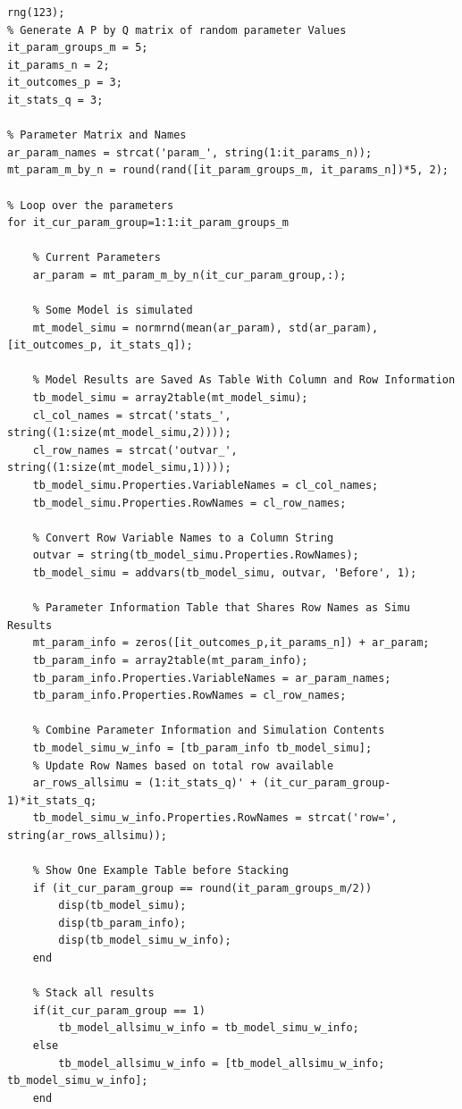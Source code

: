 \documentclass[
]{book}
\begin{document}
\begin{verbatim}
rng(123);
% Generate A P by Q matrix of random parameter Values
it_param_groups_m = 5; 
it_params_n = 2;
it_outcomes_p = 3;
it_stats_q = 3;

% Parameter Matrix and Names
ar_param_names = strcat('param_', string(1:it_params_n));
mt_param_m_by_n = round(rand([it_param_groups_m, it_params_n])*5, 2);

% Loop over the parameters
for it_cur_param_group=1:1:it_param_groups_m
    
    % Current Parameters
    ar_param = mt_param_m_by_n(it_cur_param_group,:);
    
    % Some Model is simulated
    mt_model_simu = normrnd(mean(ar_param), std(ar_param), [it_outcomes_p, it_stats_q]);
    
    % Model Results are Saved As Table With Column and Row Information
    tb_model_simu = array2table(mt_model_simu);
    cl_col_names = strcat('stats_', string((1:size(mt_model_simu,2))));
    cl_row_names = strcat('outvar_', string((1:size(mt_model_simu,1))));
    tb_model_simu.Properties.VariableNames = cl_col_names;
    tb_model_simu.Properties.RowNames = cl_row_names;    
        
    % Convert Row Variable Names to a Column String
    outvar = string(tb_model_simu.Properties.RowNames);
    tb_model_simu = addvars(tb_model_simu, outvar, 'Before', 1);
    
    % Parameter Information Table that Shares Row Names as Simu Results
    mt_param_info = zeros([it_outcomes_p,it_params_n]) + ar_param;
    tb_param_info = array2table(mt_param_info);
    tb_param_info.Properties.VariableNames = ar_param_names;
    tb_param_info.Properties.RowNames = cl_row_names;
    
    % Combine Parameter Information and Simulation Contents
    tb_model_simu_w_info = [tb_param_info tb_model_simu];
    % Update Row Names based on total row available
    ar_rows_allsimu = (1:it_stats_q)' + (it_cur_param_group-1)*it_stats_q;
    tb_model_simu_w_info.Properties.RowNames = strcat('row=', string(ar_rows_allsimu));
    
    % Show One Example Table before Stacking
    if (it_cur_param_group == round(it_param_groups_m/2))
        disp(tb_model_simu);
        disp(tb_param_info);
        disp(tb_model_simu_w_info);
    end
    
    % Stack all results
    if(it_cur_param_group == 1)
        tb_model_allsimu_w_info = tb_model_simu_w_info;
    else
        tb_model_allsimu_w_info = [tb_model_allsimu_w_info; tb_model_simu_w_info];
    end
    

\end{verbatim}
\end{document}
